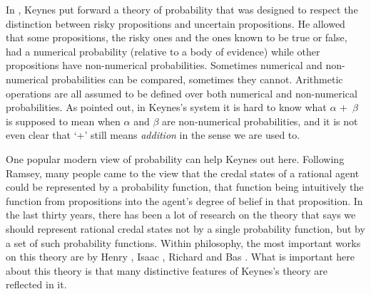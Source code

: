 In \citeyearpar{Keynes1921}, Keynes put forward a theory of probability that was designed to respect the distinction between risky propositions and uncertain propositions. He allowed that some propositions, the risky ones and the ones known to be true or false, had a numerical probability (relative to a body of evidence) while other propositions have non-numerical probabilities. Sometimes numerical and non-numerical probabilities can be compared, sometimes they cannot. Arithmetic operations are all assumed to be defined over both numerical and non-numerical probabilities. As \citet{RamseyTruthProb} pointed out, in Keynes's system it is hard to know what ${\alpha}$ +~${\beta}$ is supposed to mean when ${\alpha}$ and ${\beta}$ are non\nobreakdash-numerical probabilities, and it is not even clear that `+' still means \textit{addition} in the sense we are used to.

One popular modern view of probability can help Keynes out here. Following Ramsey, many people came to the view that the credal states of a rational agent could be represented by a probability function, that function being intuitively the function from propositions into the agent's degree of belief in that proposition. In the last thirty years, there has been a lot of research on the theory that says we should represent rational credal states not by a single probability function, but by a set of such probability functions. Within philosophy, the most important works on this theory are by Henry \citet{Kyburg1974}, Isaac \citet{Levi1974, Levi1980}, Richard \citet{Jeffrey1983} and Bas \citet{vanFraassen1990}. What is important here about this theory is that many distinctive features of Keynes's theory are reflected in it.

